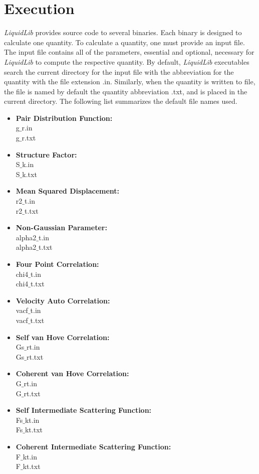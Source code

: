 \documentclass{article}
\begin{document}
\section{Execution}
\textit{LiquidLib} provides source code to several binaries.  Each binary is designed to calculate one quantity.  To calculate a quantity, one must provide an input file.  The input file contains all of the parameters, essential and optional, necessary for \textit{LiquidLib} to compute the respective quantity.  By default, \textit{LiquidLib} executables search the current directory for the input file with the abbreviation for the quantity with the file extension .in.  Similarly, when the quantity is written to file, the file is named by default the quantity abbreviation .txt, and is placed in the current directory.  The following list summarizes the default file names used.
\begin{multicols}{2} \label{input_output}
\begin{itemize}
\item \textbf{Pair Distribution Function:}
 \\g$\_$r.in
 \\g$\_$r.txt
\item \textbf{Structure Factor:}
 \\S$\_$k.in
 \\S$\_$k.txt
\item \textbf{Mean Squared Displacement:}
 \\r2$\_$t.in
 \\r2$\_$t.txt
\item \textbf{Non-Gaussian Parameter:}
 \\alpha2$\_$t.in
 \\alpha2$\_$t.txt
 \item \textbf{Four Point Correlation:}
 \\chi4$\_$t.in
 \\chi4$\_$t.txt
 \item \textbf{Velocity Auto Correlation:}
 \\vacf$\_$t.in
 \\vacf$\_$t.txt
  \item \textbf{Self van Hove Correlation:}
 \\Gs$\_$rt.in
 \\Gs$\_$rt.txt
 \item \textbf{Coherent van Hove Correlation:}
 \\G$\_$rt.in
 \\G$\_$rt.txt
\item \textbf{Self Intermediate Scattering Function:}
 \\Fs$\_$kt.in
 \\Fs$\_$kt.txt
\item \textbf{Coherent Intermediate Scattering Function:}
\\F$\_$kt.in
\\F$\_$kt.txt
\end{itemize}
\end{multicols}
\end{document}
